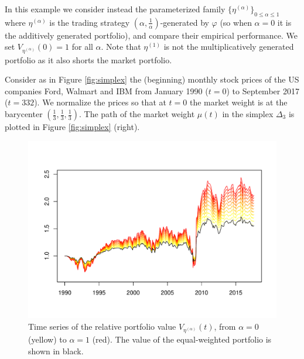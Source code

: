 \documentclass[graybox]{svmult}
\begin{document}
 In this example we consider instead the parameterized family $\{ \eta^{(\alpha)} \}_{0 \leq \alpha \leq 1}$ where $\eta^{(\alpha)}$ is the trading strategy $(\alpha, \frac{1}{\alpha})$-generated by $\varphi$ (so when $\alpha = 0$ it is the additively generated portfolio), and compare their empirical performance. We set $V_{\eta^{(\alpha)}}(0) = 1$ for all $\alpha$.  Note that $\eta^{(1)}$ is not the multiplicatively generated portfolio as it also shorts the market portfolio.

Consider as in Figure \ref{fig:simplex} the (beginning) monthly stock prices of the US companies Ford, Walmart and IBM from January 1990 ($t = 0$) to  September 2017 ($t = 332$). We normalize the prices so that at $t = 0$ the market weight is at the barycenter $\left(\frac{1}{3}, \frac{1}{3}, \frac{1}{3}\right)$. The path of the market weight $\mu(t)$ in the simplex $\Delta_3$ is plotted in Figure \ref{fig:simplex} (right).

\begin{figure}[t!]
\centering
\includegraphics[scale=0.5]{simulation.pdf}
\caption{Time series of the relative portfolio value $V_{\eta^{(\alpha)}}(t)$, from $\alpha = 0$ (yellow) to $\alpha = 1$ (red). The value of the equal-weighted portfolio is shown in black.}
\label{fig:output}
\end{figure}
\end{document}
